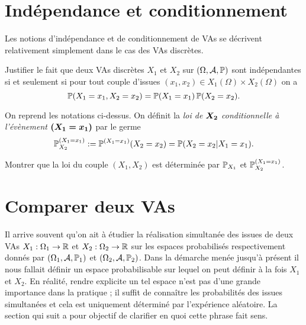 \documentclass[11pt, a4paper]{article}
\begin{document}
\section{Indépendance et conditionnement}
\label{sec:independanceetconditionnement}

Les notions d'indépendance et de conditionnement de VAs se décrivent
relativement simplement dans le cas des VAs discrètes.
\begin{question}
  Justifier le fait que deux VAs discrètes $X_1$ et $X_2$ sur
  $(\Omega, \mathcal{A}, \operatorname{\mathbb{P}})$ sont indépendantes si et seulement si pour
  tout couple d'issues $(x_1, x_2) \in X_1(\Omega)\times X_2(\Omega)$
  on a
  \[
    \operatorname{\mathbb{P}}(X_1 = x_1, X_2 = x_2) = \operatorname{\mathbb{P}}(X_1 = x_1)\operatorname{\mathbb{P}}(X_2 = x_2).
  \]
\end{question}
On reprend les notations ci-dessus. On définit la \emph{loi de
  $\boldsymbol{X_2}$ conditionnelle à l'évènement $\boldsymbol{(X_1 = x_1)}$} par le
germe
\[
  \operatorname{\mathbb{P}}_{X_2}^{(X_1 = x_1)} := \operatorname{\mathbb{P}}^{(X_1 = x_1)}(X_2 = x_2) = \operatorname{\mathbb{P}}(X_2 =
  x_2 | X_1 = x_1).
\]
\begin{question}
  Montrer que la loi du couple $(X_1, X_2)$ est déterminée par
  $\operatorname{\mathbb{P}}_{X_1}$ et $\operatorname{\mathbb{P}}_{X_2}^{(X_1 = x_1)}$.
\end{question}

\section{Comparer deux VAs}
\label{sec:comparerdeuxVAs}

Il arrive souvent qu'on ait à étudier la réalisation simultanée des
issues de deux VAs $X_1 : \Omega_1 \to \mathbb{R}$ et $X_2 : \Omega_2 \to \mathbb{R}$
sur les espaces probabilisés respectivement donnés par
$(\Omega_1, \mathcal{A}, \operatorname{\mathbb{P}}_1)$ et $(\Omega_2, \mathcal{A}, \operatorname{\mathbb{P}}_2)$.  Dans la
démarche menée jusqu'à présent il nous fallait définir un espace
probabilisable sur lequel on peut définir à la fois $X_1$ et $X_2$. En
réalité, rendre explicite un tel espace n'est pas d'une grande
importance dans la pratique ; il suffit de connaître les probabilités
des issues simultanées et cela est uniquement déterminé par
l'expérience aléatoire. La section qui suit a pour objectif de
clarifier en quoi cette phrase fait sens.
\end{document}
